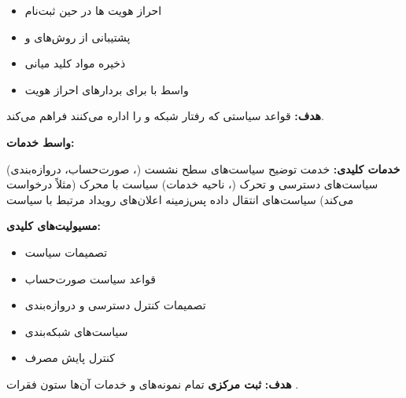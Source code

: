 \begin{itemize}
\tightlist
\item
  احراز هویت ها در حین ثبت‌نام
\item
  پشتیبانی از روش‌های  و 
\item
  ذخیره مواد کلید میانی 
\item
  واسط با  برای بردارهای احراز هویت
\end{itemize}


\textbf{هدف:} قواعد سیاستی که رفتار شبکه و  را اداره می‌کنند فراهم می‌کند.

\textbf{واسط خدمات:} 

\textbf{خدمات کلیدی:}\CNbr{}\lr{\textbar{}} خدمت \lr{\textbar{}} توضیح \lr{\textbar{}}\CNbr{}\CNbr{} سیاست‌های سطح نشست (، صورت‌حساب، دروازه‌بندی) \lr{\textbar{}}\CNbr{} سیاست‌های دسترسی و تحرک (، ناحیه خدمات) \lr{\textbar{}}\CNbr{} سیاست با محرک  (مثلاً  درخواست  می‌کند) \lr{\textbar{}}\CNbr{} سیاست‌های انتقال داده پس‌زمینه \lr{\textbar{}}\CNbr{} اعلان‌های رویداد مرتبط با سیاست \lr{\textbar{}}

\textbf{مسیولیت‌های کلیدی:}

\begin{itemize}
\tightlist
\item
  تصمیمات سیاست 
\item
  قواعد سیاست صورت‌حساب
\item
  تصمیمات کنترل دسترسی و دروازه‌بندی
\item
  سیاست‌های شبکه‌بندی
\item
  کنترل پایش مصرف
\end{itemize}


\textbf{هدف:} \textbf{ثبت مرکزی} تمام نمونه‌های  و خدمات آن‌ها  ستون فقرات .

